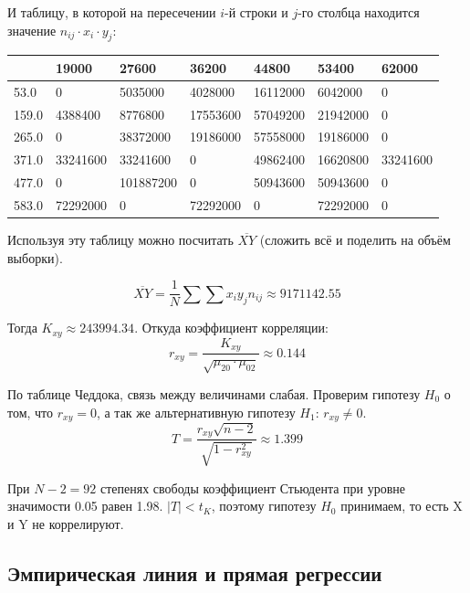 \documentclass[titlepage]{article}
\begin{document}
И таблицу, в которой на пересечении $i$-й строки и $j$-го столбца находится значение $n_{ij} \cdot x_i \cdot y_j$:

\begin{table}[!ht]
    \centering
    \begin{tabular}{|l|l|l|l|l|l|l|}
    \hline
        ~ & 19000 & 27600 & 36200 & 44800 & 53400 & 62000 \\ \hline
        53.0 & 0 & 5035000 & 4028000 & 16112000 & 6042000 & 0 \\ \hline
        159.0 & 4388400 & 8776800 & 17553600 & 57049200 & 21942000 & 0 \\ \hline
        265.0 & 0 & 38372000 & 19186000 & 57558000 & 19186000 & 0 \\ \hline
        371.0 & 33241600 & 33241600 & 0 & 49862400 & 16620800 & 33241600 \\ \hline
        477.0 & 0 & 101887200 & 0 & 50943600 & 50943600 & 0 \\ \hline
        583.0 & 72292000 & 0 & 72292000 & 0 & 72292000 & 0 \\ \hline
    \end{tabular}
\end{table}

Используя эту таблицу можно посчитать $\overline{XY}$ (сложить всё и поделить на объём выборки).

\begin{equation*}
\overline{XY} = \frac{1}{N} \sum \sum x_i y_j n_{ij} \approx 9171142.55
\end{equation*}

Тогда $K_{xy} \approx 243994.34$. Откуда коэффициент корреляции:
\begin{equation*}
r_{xy} = \frac{K_{xy} }{ \sqrt{\mu_{20} \cdot \mu_{02} } } \approx 0.144
\end{equation*}

По таблице Чеддока, связь между величинами слабая. Проверим гипотезу $H_0$ о том, что $r_{xy} = 0$, а так же альтернативную гипотезу $H_1$: $r_{xy} \ne 0$.
\begin{equation*}
T = \frac{r_{xy} \sqrt{n - 2} }{\sqrt{1 - r^2_{xy} } } \approx 1.399
\end{equation*}

При $N - 2 = 92$ степенях свободы коэффициент Стьюдента при уровне значимости 0.05  равен 1.98.
$|T| < t_K$, поэтому гипотезу $H_0$ принимаем, то есть X и Y не коррелируют.
\clearpage

\subsection{Эмпирическая линия и прямая регрессии}
\end{document}
